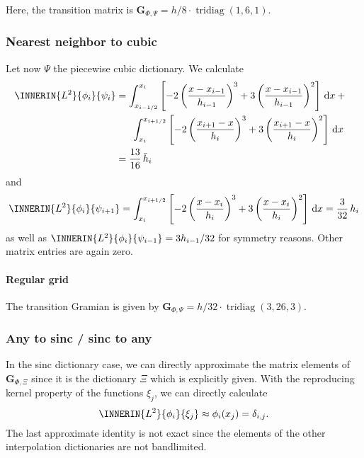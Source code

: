 \documentclass[a4paper]{paper}
\DeclareMathOperator{\TRIDIAG}{{tridiag}}
\newcommand*{\D}{{\ensuremath{\mathrm{d}}}}
\newcommand*{\BDG}{\boldsymbol{G}}
\begin{document}
Here, the transition matrix is $\BDG_{\Phi, \Psi} = h/8\cdot\TRIDIAG(1, 6, 1)$.


\subsubsection{Nearest neighbor to cubic}
\label{subsubsec:specif:rediscr:nn2cub}

Let now $\Psi$ the piecewise cubic dictionary. We calculate
%
\begin{align*}
 \INNERIN{L^2}{\phi_i}{\psi_i} 
 &= \int_{x_{i-1/2}}^{x_i} 
 \left[ -2\left( \frac{x-x_{i-1}}{h_{i-1}} \right)^3 + 3 \left( \frac{x-x_{i-1}}{h_{i-1}} \right)^2 
 \right]\, \D x + \phantom{x} \\
 &\hspace{16pt} \int_{x_i}^{x_{i+1/2}} 
 \left[ -2\left( \frac{x_{i+1}-x}{h_i} \right)^3 + 3\left( \frac{x_{i+1}-x}{h_i} \right)^2 
 \right]\, \D x \\
 &= \frac{13}{16}\, \bar h_i
\end{align*}
%
and
%
\begin{equation*}
 \INNERIN{L^2}{\phi_i}{\psi_{i+1}} 
 = \int_{x_i}^{x_{i+1/2}} 
 \left[ -2\left( \frac{x-x_i}{h_i} \right)^3 + 3 \left( \frac{x-x_i}{h_i} \right)^2 
 \right]\, \D x 
 = \frac{3}{32}\, h_i
\end{equation*}
%
as well as $\INNERIN{L^2}{\phi_i}{\psi_{i-1}} = 3h_{i-1}/32$ for symmetry reasons. Other matrix 
entries are again zero.

\paragraph{Regular grid}

The transition Gramian is given by $\BDG_{\Phi, \Psi} = h/32\cdot\TRIDIAG(3, 26, 3)$.

\subsubsection{Any to sinc / sinc to any}
\label{subsubsec:specif:rediscr:any2sinc}

In the sinc dictionary case, we can directly approximate the matrix elements of $\BDG_{\Phi, \Xi}$ since it is the 
dictionary $\Xi$ which is explicitly given. With the reproducing kernel property of the functions $\xi_j$, we 
can directly calculate
%
\begin{equation*}
 \INNERIN{L^2}{\phi_i}{\xi_j} \approx \phi_i(x_j) = \delta_{i,j}.
\end{equation*}
%
The last approximate identity is not exact since the elements of the other interpolation dictionaries are not 
bandlimited.
\end{document}
